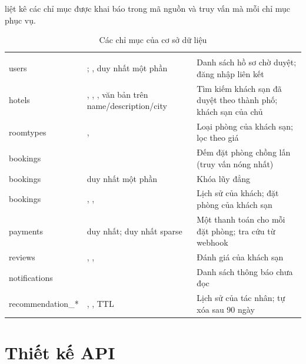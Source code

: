  liệt kê các chỉ mục được khai báo trong mã nguồn và truy vấn mà mỗi chỉ mục phục vụ.

\begin{rtable}
\begin{longtable}{|L{3.0cm}|L{5.4cm}|L{6.4cm}|}
\caption{Các chỉ mục của cơ sở dữ liệu}\label{tab:indexes}\\
\hline
{} &  &  \\ \hline
\endfirsthead
\hline
{} &  &  \\ \hline
\endhead
users & ; ,  duy nhất một phần & Danh sách hồ sơ chờ duyệt; đăng nhập liên kết \\ \hline
hotels & , , , văn bản trên name/description/city & Tìm kiếm khách sạn đã duyệt theo thành phố; khách sạn của chủ \\ \hline
roomtypes & ,  & Loại phòng của khách sạn; lọc theo giá \\ \hline
bookings &  & Đếm đặt phòng chồng lấn (truy vấn nóng nhất) \\ \hline
bookings &  duy nhất một phần & Khóa lũy đẳng \\ \hline
bookings & , ,  & Lịch sử của khách; đặt phòng của khách sạn \\ \hline
payments &  duy nhất;  duy nhất sparse & Một thanh toán cho mỗi đặt phòng; tra cứu từ webhook \\ \hline
reviews & , ,  & Đánh giá của khách sạn \\ \hline
notifications &  & Danh sách thông báo chưa đọc \\ \hline
recommendation\_* & , , TTL & Lịch sử của tác nhân; tự xóa sau 90 ngày \\ \hline
\end{longtable}
\end{rtable}

\section{Thiết kế API}\label{sec:api-design}

